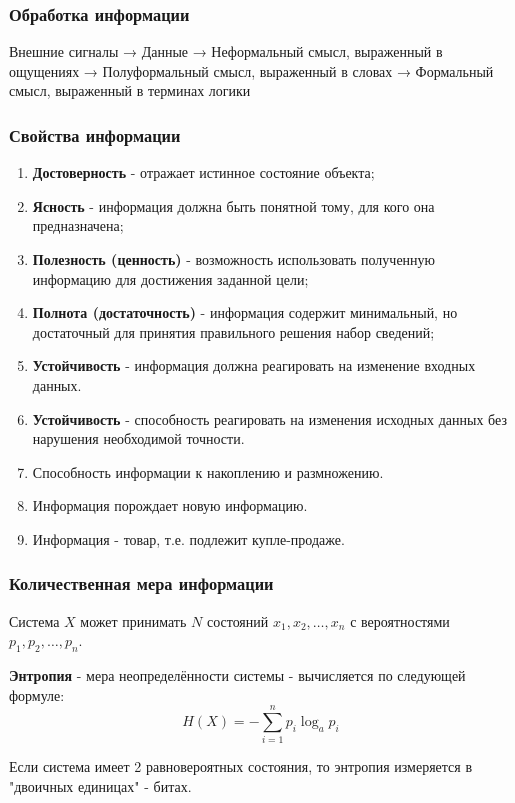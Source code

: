 \subsubsection*{Обработка информации}

Внешние сигналы 
→ Данные 
→ Неформальный смысл, выраженный в ощущениях 
→ Полуформальный смысл, выраженный в словах 
→ Формальный смысл, выраженный в терминах логики

\subsubsection{Свойства информации}
\begin{enumerate}  
  \item \textbf{Достоверность} - отражает истинное состояние объекта;
  \item \textbf{Ясность} - информация должна быть понятной тому, для кого она предназначена;
  \item \textbf{Полезность (ценность)} - возможность использовать полученную информацию для достижения заданной цели;
  \item \textbf{Полнота (достаточность)} - информация содержит минимальный, но достаточный для принятия правильного решения набор сведений;
  \item \textbf{Устойчивость} - информация должна реагировать на изменение входных данных.
  \item \textbf{Устойчивость} - способность реагировать на изменения исходных данных без нарушения необходимой точности.
  \item Способность информации к накоплению и размножению.
  \item Информация порождает новую информацию.
  \item Информация - товар, т.е. подлежит купле-продаже.
\end{enumerate} 

\subsubsection{Количественная мера информации}

Система $X$ может принимать $N$ состояний $x_1, x_2, \ldots, x_{n}$ с вероятностями $p_1, p_2, \ldots, p_n$.
\begin{definition}
\textbf{Энтропия} - мера неопределённости системы - вычисляется по следующей формуле: \[
    H(X) = - \sum_{i=1}^{n} p_i \log_a p_i
  \]  
\end{definition}

Если система имеет 2 равновероятных состояния, то энтропия измеряется в "двоичных единицах" - битах.

